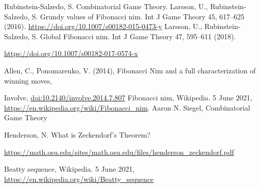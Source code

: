 \documentclass[11pt,twoside]{scrartcl}
\begin{document}
\clearpage
{}
\begin{thebibliography}{99}
     Rubinstein-Salzedo, S. Combinatorial Game Theory. 
     Larsson, U., Rubinstein-Salzedo, S. Grundy values of Fibonacci nim. Int J Game Theory 45, 617–625 (2016). \url{https://doi.org/10.1007/s00182-015-0473-y}
     Larsson, U., Rubinstein-Salzedo, S. Global Fibonacci nim. Int J Game Theory 47, 595–611 (2018). 
    
    \url{https://doi.org/10.1007/s00182-017-0574-x}

     Allen, C., Ponomarenko, V. (2014), Fibonacci Nim and a full characterization of winning moves, 
    
    Involve, \href{https://msp.org/involve/2014/7-6/p08.xhtml}{doi:10.2140/involve.2014.7.807}
     Fibonacci nim, Wikipedia. 5 June 2021, \url{https://en.wikipedia.org/wiki/Fibonacci_nim}.
     Aaron N. Siegel, Combinatorial Game Theory

     Henderson, N. What is Zeckendorf’s Theorem?

    \url{https://math.osu.edu/sites/math.osu.edu/files/henderson_zeckendorf.pdf}

    Beatty sequence, Wikipedia. 5 June 2021, \url{https://en.wikipedia.org/wiki/Beatty_sequence}
\end{thebibliography}
\end{document}
